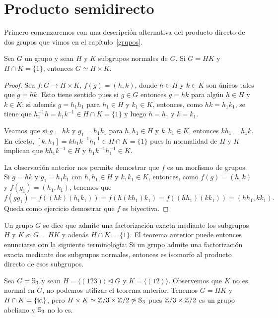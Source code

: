 \chapter{Producto semidirecto}

Primero comenzaremos con una descripción alternativa del producto directo de dos grupos que vimos en el capítulo~\ref{grupos}. 

\begin{theorem}
Sea $G$ un grupo y sean $H$ y $K$ subgrupos normales de $G$. Si $G=HK$ y $H\cap K=\{1\}$, entonces $G\simeq H\times K$.
\end{theorem}

\begin{proof}
Sea $f\colon G\to H\times K$, $f(g)=(h,k)$, donde $h\in H$ y $k\in K$ son únicos tales que $g=hk$. Esto tiene sentido pues si $g\in G$ entonces $g=hk$ para algún $h\in H$ y $k\in K$; si además $g=h_1h_1$ para $h_1\in H$ y $k_1\in K$, entonces, como $hk=h_1k_1$, se tiene que $h_1^{-1}h=k_1k^{-1}\in H\cap K=\{1\}$ y luego $h=h_1$ y $k=k_1$.

Veamos que si $g=hk$ y $g_1=h_1k_1$ para $h,h_1\in H$ y $k,k_1\in K$, entonces $kh_1=h_1k$. En efecto, $[k,h_1]=kh_1k^{-1}h_1^{-1}\in H\cap K=\{1\}$ pues la normalidad de $H$ y $K$ implican que $ kh_1k^{-1}\in H$ y $h_1k^{-1}h_1^{-1}\in K$.

La observación anterior nos permite demostrar que $f$ es un morfismo de grupos. Si $g=hk$ y $g_1=h_1k_1$ con $h,h_1\in H$ y $k,k_1\in K$, entonces, como $f(g)=(h,k)$ y $f(g_1)=(h_1,k_1)$, tenemos que
\[
f(gg_1)=f((hk)(h_1k_1))=f(h(kh_1)k_1)=f((hh_1)(kk_1))=(hh_1,kk_1).
\]
Queda como ejercicio demostrar que $f$ es biyectiva. 
\end{proof}

Un grupo $G$ se dice que admite una factorización exacta mediante los subgrupos $H$ y $K$ si $G=HK$ y adenás $H\cap K=\{1\}$. 
El teorema anterior puede entonces enunciarse con la siguiente terminología: Si un grupo admite una factorización exacta mediante dos subgrupos normales, entonces es isomorfo al producto directo de esos subgrupos. 

\begin{example}
Sea $G=\mathbb{S}_3$ y sean $H=\langle (123)\rangle\unlhd G$ y $K=\langle (12)\rangle$. Observemos que $K$ no es normal en $G$, no podemos utilizar el teorema anterior. Tenemos $G=HK$ y $H\cap K=\{\operatorname{id}\}$, pero $H\times K\simeq\mathbb{Z}/3\times\mathbb{Z}/2\not\simeq\mathbb{S}_3$ pues $\mathbb{Z}/3\times\mathbb{Z}/2$ es un grupo abeliano y $\mathbb{S}_3$ no lo es.
\end{example}

